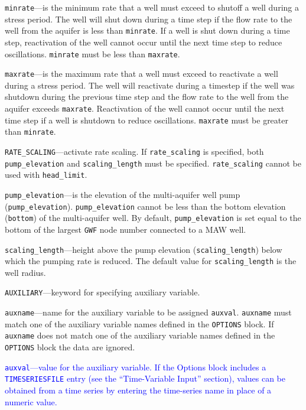 \begin{description}
\item \texttt{minrate}---is the minimum rate that a well must exceed to shutoff a well during a stress period. The well will shut down during a time step if the flow rate to the well from the aquifer is less than \texttt{minrate}. If a well is shut down during a time step, reactivation of the well cannot occur until the next time step to reduce oscillations. \texttt{minrate} must be less than \texttt{maxrate}.

\item \texttt{maxrate}---is the maximum rate that a well must exceed to reactivate a well during a stress period. The well will reactivate during a timestep if the well was shutdown during the previous time step and the flow rate to the well from the aquifer exceeds \texttt{maxrate}. Reactivation of the well cannot occur until the next time step if a well is shutdown to reduce oscillations. \texttt{maxrate} must be greater than \texttt{minrate}.

\item \texttt{RATE\_SCALING}---activate rate scaling.  If \texttt{rate\_scaling} is specified, both \texttt{pump\_elevation} and \texttt{scaling\_length} must be specified. \texttt{rate\_scaling} cannot be used with \texttt{head\_limit}.

\item \texttt{pump\_elevation}---is the elevation of the multi-aquifer well pump (\texttt{pump\_elevation}).  \texttt{pump\_elevation} cannot be less than the bottom elevation (\texttt{bottom}) of the multi-aquifer well. By default, \texttt{pump\_elevation} is set equal to the bottom of the largest \texttt{GWF} node number connected to a MAW well.

\item \texttt{scaling\_length}---height above the pump elevation (\texttt{scaling\_length}) below which the pumping rate is reduced.  The default value for \texttt{scaling\_length} is the well radius.

\item \texttt{AUXILIARY}---keyword for specifying auxiliary variable.

\item \texttt{auxname}---name for the auxiliary variable to be assigned \texttt{auxval}.  \texttt{auxname} must match one of the auxiliary variable names defined in the \texttt{OPTIONS} block. If \texttt{auxname} does not match one of the auxiliary variable names defined in the \texttt{OPTIONS} block the data are ignored.

\item \textcolor{blue}{\texttt{auxval}---value for the auxiliary variable. If the Options block includes a \texttt{TIMESERIESFILE} entry (see the ``Time-Variable Input'' section), values can be obtained from a time series by entering the time-series name in place of a numeric value.}

\end{description}

